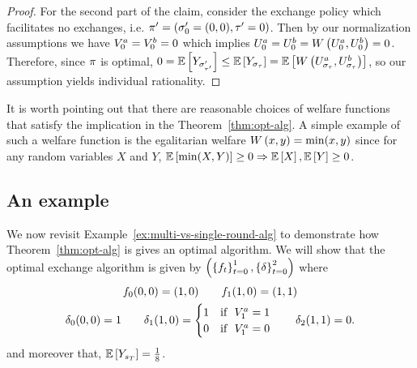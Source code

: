 \begin{proof}
    For the second part of the claim,
    consider the exchange policy which facilitates no exchanges, i.e.
    \(
        \pi'
        =
        \left(
            \sigma'_{0} = (0,0),
            \tau' = 0
        \right) 
    \).
    Then by our normalization assumptions we have
    \(
        V^a_{0} = V^b_{0} = 0
    \)
    which implies 
    \(
        U^a_{0}
        =
        U^b_{0}
        =
        W\left(
            U^a_{0},
            U^b_{0}
        \right)
        =0
    \).
    Therefore, since $\pi$ is optimal,
    \(
        0
        =
        \mathbb{E}\left[
            Y_{
                \sigma'_{\tau'}
            }
        \right]
        \leq
        \mathbb{E}\left[
            Y_{
                \sigma_{\tau}
            }
        \right]
        =
        \mathbb{E}\left[
            W\left(
                U^a_{
                    \sigma_{\tau}
                },
                U^b_{
                    \sigma_{\tau}
                }
            \right)
        \right]
    \),
    so our assumption yields individual rationality.
\end{proof}  

It is worth pointing out that there are reasonable choices of welfare functions that satisfy the implication
in the Theorem~\ref{thm:opt-alg}. 
A simple example of such a welfare function is the egalitarian welfare
\(
    W\left(x,y\right)=\min(x,y)
\)
since for any random variables $X$ and $Y$,
\(
    \mathbb{E}\left[
        \min(X,Y)
    \right]
    \geq 0
    \Rightarrow
    \mathbb{E}\left[X\right],
    \mathbb{E}\left[Y\right]
    \geq 0
\).


\subsection{An example}
\label{sec:algoexample}

We now revisit Example~\ref{ex:multi-vs-single-round-alg} to demonstrate how Theorem~\ref{thm:opt-alg}
is gives an optimal algorithm.
We will show that the optimal exchange algorithm is given by
    \(
        \left(
            \left\{f_{t}\right\}_{t=0}^{1},
            \left\{\delta\right\}_{t=0}^{2}
        \right)
    \)
    where 
    \begin{gather*}
        f_{0}(0,0) = (1,0)
        \qquad
        f_{1}(1,0) = (1,1)
        \\
        \delta_{0}(0,0) = 1
        \qquad
        \delta_{1}(1,0) 
        =
        \begin{cases}
            1 & \text{if } ~V^a_{1} = 1
            \\
            0 & \text{if } ~V^a_{1} = 0
        \end{cases}  
        \qquad
        \delta_{2}(1,1) 
        = 0 . 
    \end{gather*}  
    and moreover that,
    \(
        \mathbb{E}\left[
            Y_{
                s_{T}
            }
        \right]
        =
        \frac{1}{8}
    \).

